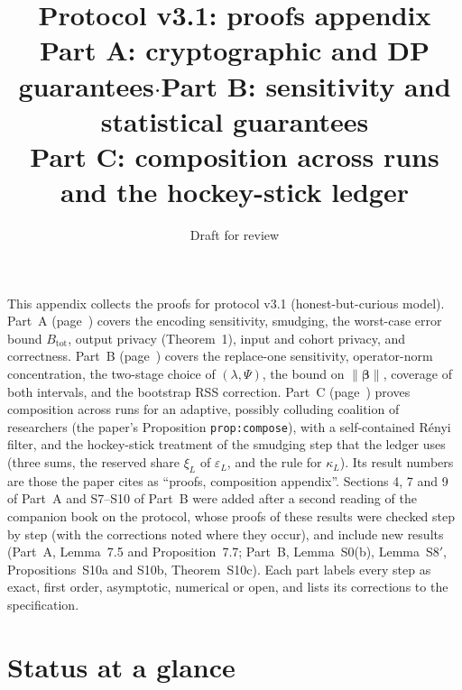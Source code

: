 \documentclass[11pt]{article}
\title{\textbf{Protocol v3.1: proofs appendix}\\[4pt]\large Part A: cryptographic and DP guarantees\quad$\cdot$\quad Part B: sensitivity and statistical guarantees\\ Part C: composition across runs and the hockey-stick ledger}
\date{Draft for review}
\begin{document}
\maketitle
{}

\noindent This appendix collects the proofs for protocol v3.1 (honest-but-curious model). Part~A (page~\pageref{partA}) covers the encoding sensitivity, smudging, the worst-case error bound $B_{\mathrm{tot}}$, output privacy (Theorem~1), input and cohort privacy, and correctness. Part~B (page~\pageref{partB}) covers the replace-one sensitivity, operator-norm concentration, the two-stage choice of $(\lambda,\Psi)$, the bound on $\|\boldsymbol\beta\|$, coverage of both intervals, and the bootstrap RSS correction. Part~C (page~\pageref{partC}) proves composition across runs for an adaptive, possibly colluding coalition of researchers (the paper's Proposition \texttt{prop:compose}), with a self-contained R\'enyi filter, and the hockey-stick treatment of the smudging step that the ledger uses (three sums, the reserved share $\xi_L$ of $\varepsilon_L$, and the rule for $\kappa_L$). Its result numbers are those the paper cites as ``proofs, composition appendix''. Sections 4, 7 and 9 of Part~A and S7--S10 of Part~B were added after a second reading of the companion book on the protocol, whose proofs of these results were checked step by step (with the corrections noted where they occur), and include new results (Part~A, Lemma~7.5 and Proposition~7.7; Part~B, Lemma~S0(b), Lemma~S8$'$, Propositions~S10a and S10b, Theorem~S10c). Each part labels every step as exact, first order, asymptotic, numerical or open, and lists its corrections to the specification.

\section*{Status at a glance}
\end{document}
